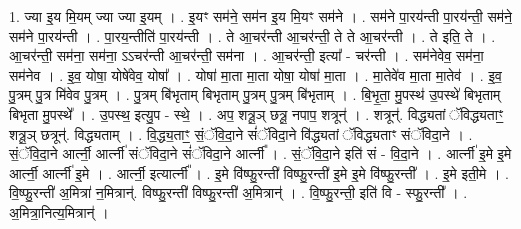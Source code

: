 \documentclass[17pt]{extarticle}
\begin{document}
1. ज्या इ॒य मि॒यम् ज्या ज्या इ॒यम् । . इ॒यꣳ सम॑ने॒ सम॑न इ॒य मि॒यꣳ सम॑ने । . सम॑ने पा॒रय॑न्ती पा॒रय॑न्ती॒ सम॑ने॒ सम॑ने पा॒रय॑न्ती । . पा॒रय॒न्तीति॑ पा॒रय॑न्ती । . ते आ॒चर॑न्ती आ॒चर॑न्ती॒ ते ते आ॒चर॑न्ती । . ते इति॒ ते । . आ॒चर॑न्ती॒ सम॑ना॒ सम॑ना॒ ऽऽचर॑न्ती आ॒चर॑न्ती॒ सम॑ना । . आ॒चर॑न्ती॒ इत्या᳚ - चर॑न्ती । . सम॑नेवेव॒ सम॑ना॒ सम॑नेव । . इ॒व॒ योषा॒ योषे॑वेव॒ योषा᳚ । . योषा॑ मा॒ता मा॒ता योषा॒ योषा॑ मा॒ता । . मा॒तेवे॑व मा॒ता मा॒तेव॑ । . इ॒व॒ पु॒त्रम् पु॒त्र मि॑वेव पु॒त्रम् । . पु॒त्रम् बि॑भृताम् बिभृताम् पु॒त्रम् पु॒त्रम् बि॑भृताम् । . बि॒भृ॒ता॒ मु॒पस्थ॑ उ॒पस्थे॑ बिभृताम् बिभृता मु॒पस्थे᳚ । . उ॒पस्थ॒ इत्यु॒प - स्थे॒ । . अप॒ शत्रू॒ञ् छत्रू॒ नपाप॒ शत्रून्॑ । . शत्रून्॑. विद्ध्यतां ॅविद्ध्यताꣳ॒॒ शत्रू॒ञ् छत्रून्॑. विद्ध्यताम् । . वि॒द्ध्य॒ताꣳ॒॒ सं॒ॅवि॒दा॒ने सं॑ॅविदा॒ने वि॑द्ध्यतां ॅविद्ध्यताꣳ संॅविदा॒ने । . सं॒ॅवि॒दा॒ने आर्त्नी॒ आर्त्नी॑ संॅविदा॒ने सं॑ॅविदा॒ने आर्त्नी᳚ । . सं॒ॅवि॒दा॒ने इति॑ सं - वि॒दा॒ने । . आर्त्नी॑ इ॒मे इ॒मे आर्त्नी॒ आर्त्नी॑ इ॒मे । . आर्त्नी॒ इत्यार्त्नी᳚ । . इ॒मे वि॑ष्फु॒रन्ती॑ विष्फु॒रन्ती॑ इ॒मे इ॒मे वि॑ष्फु॒रन्ती᳚ । . इ॒मे इती॒मे । . वि॒ष्फु॒रन्ती॑ अ॒मित्रा॑ न॒मित्रान्॑. विष्फु॒रन्ती॑ विष्फु॒रन्ती॑ अ॒मित्रान्॑ । . वि॒ष्फु॒रन्ती॒ इति॑ वि - स्फु॒रन्ती᳚ । . अ॒मित्रा॒नित्य॒मित्रान्॑ । \newline
\end{document}
